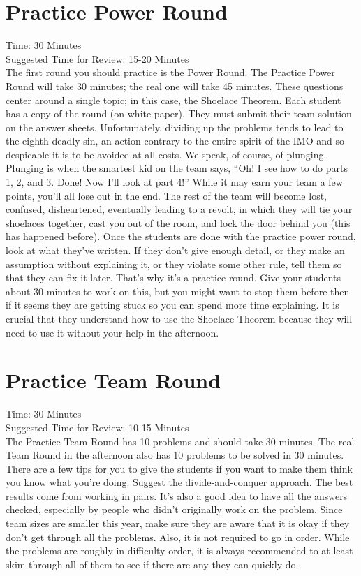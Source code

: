 \documentclass[11pt]{article}
\begin{document}
\begin{small}
\section{Practice Power Round}
\noindent Time: 30 Minutes \\
\noindent Suggested Time for Review: 15-20 Minutes\\
\noindent The first round you should practice is the Power Round. The Practice Power Round will take 30 minutes; the real one will take 45 minutes. These questions center around a single topic; in this case, the Shoelace Theorem.  Each student has a copy of the round (on white paper).  They must submit their team solution on the answer sheets. Unfortunately, dividing up the problems tends to lead to the eighth deadly sin, an action contrary to the entire spirit of the IMO and so despicable it is to be avoided at all costs. We speak, of course, of plunging. Plunging is when the smartest kid on the team says, ``Oh! I see how to do parts 1, 2, and 3. Done! Now I'll look at part 4!'' While it may earn your team a few points, you'll all lose out in the end. The rest of the team will become lost, confused, disheartened, eventually leading to a revolt, in which they will tie your shoelaces together, cast you out of the room, and lock the door behind you (this has happened before). Once the students are done with the practice power round, look at what they've written. If they don't give enough detail, or they make an assumption without explaining it, or they violate some other rule, tell them so that they can fix it later. That's why it's a practice round. Give your students about 30 minutes to work on this, but you might want to stop them before then if it seems they are getting stuck so you can spend more time explaining. It is crucial that they understand how to use the Shoelace Theorem because they will need to use it without your help in the afternoon.

\section{Practice Team Round}
\noindent Time: 30 Minutes \\
\noindent Suggested Time for Review: 10-15 Minutes\\
\noindent The Practice Team Round has 10 problems and should take 30 minutes. The real Team Round in the afternoon also has 10 problems to be solved in 30 minutes.  There are a few tips for you to give the students if you want to make them think you know what you're doing. Suggest the divide-and-conquer approach. The best results come from working in pairs. It's also a good idea to have all the answers checked, especially by people who didn't originally work on the problem. Since team sizes are smaller this year, make sure they are aware that it is okay if they don't get through all the problems. Also, it is not required to go in order. While the problems are roughly in difficulty order, it is always recommended to at least skim through all of them to see if there are any they can quickly do.


\end{small}
\end{document}

